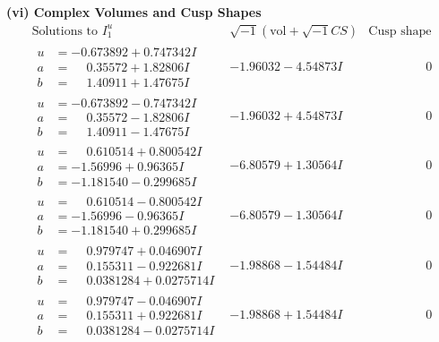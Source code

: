 \documentclass[1p]{elsarticle_modified}
\theoremstyle{definition}
\newcommand{\I}{\sqrt{-1}}
\begin{document}
\newpage\flushleft \textbf{(vi) Complex Volumes and Cusp Shapes}
$$\begin{array}{c|c|c}  
\text{Solutions to }I^u_{1}& \I (\text{vol} + \sqrt{-1}CS) & \text{Cusp shape}\\
 \hline 
\begin{aligned}
u &= -0.673892 + 0.747342 I \\
a &= \phantom{-}0.35572 + 1.82806 I \\
b &= \phantom{-}1.40911 + 1.47675 I\end{aligned}
 & -1.96032 - 4.54873 I & \phantom{-0.000000 } 0 \\ \hline\begin{aligned}
u &= -0.673892 - 0.747342 I \\
a &= \phantom{-}0.35572 - 1.82806 I \\
b &= \phantom{-}1.40911 - 1.47675 I\end{aligned}
 & -1.96032 + 4.54873 I & \phantom{-0.000000 } 0 \\ \hline\begin{aligned}
u &= \phantom{-}0.610514 + 0.800542 I \\
a &= -1.56996 + 0.96365 I \\
b &= -1.181540 - 0.299685 I\end{aligned}
 & -6.80579 + 1.30564 I & \phantom{-0.000000 } 0 \\ \hline\begin{aligned}
u &= \phantom{-}0.610514 - 0.800542 I \\
a &= -1.56996 - 0.96365 I \\
b &= -1.181540 + 0.299685 I\end{aligned}
 & -6.80579 - 1.30564 I & \phantom{-0.000000 } 0 \\ \hline\begin{aligned}
u &= \phantom{-}0.979747 + 0.046907 I \\
a &= \phantom{-}0.155311 - 0.922681 I \\
b &= \phantom{-}0.0381284 + 0.0275714 I\end{aligned}
 & -1.98868 - 1.54484 I & \phantom{-0.000000 } 0 \\ \hline\begin{aligned}
u &= \phantom{-}0.979747 - 0.046907 I \\
a &= \phantom{-}0.155311 + 0.922681 I \\
b &= \phantom{-}0.0381284 - 0.0275714 I\end{aligned}
 & -1.98868 + 1.54484 I & \phantom{-0.000000 } 0 \\ \hline\begin{aligned}

\end{aligned}
\end{array}$$
\end{document}
